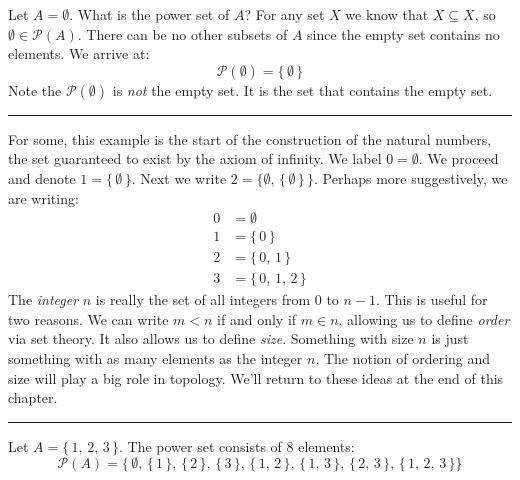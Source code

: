             \begin{example}
                Let $A=\emptyset$. What is the power set of $A$? For any set
                $X$ we know that $X\subseteq{X}$, so
                $\emptyset\in\mathcal{P}(A)$. There can be no other subsets of
                $A$ since the empty set contains no elements. We arrive at:
                \begin{equation}
                    \mathcal{P}(\emptyset)=\{\,\emptyset\,\}
                \end{equation}
                Note the $\mathcal{P}(\emptyset)$ is \textit{not} the empty set.
                It is the set that contains the empty set.
            \end{example}
            \hrule\par\hfill\par
            For some, this example is the start of the construction of the
            natural numbers, the set guaranteed to exist by the axiom of
            infinity. We label $0=\emptyset$. We proceed and denote
            $1=\{\,\emptyset\,\}$. Next we write
            $2=\{\emptyset,\,\{\,\emptyset\,\}\,\}$. Perhaps more suggestively,
            we are writing:
            \begin{align}
                0&=\emptyset\\
                1&=\{\,0\,\}\\
                2&=\{\,0,\,1\,\}\\
                3&=\{\,0,\,1,\,2\,\}
            \end{align}
            The \textit{integer} $n$ is really the set of all integers from $0$
            to $n-1$. This is useful for two reasons. We can write
            $m<n$ if and only if $m\in{n}$, allowing us to define
            \textit{order} via set theory. It also allows us to define
            \textit{size}. Something with size $n$ is just something with as
            many elements as the integer $n$. The notion of ordering and size
            will play a big role in topology. We'll return to these ideas at
            the end of this chapter.
            \par\hfill\par\hrule
            \begin{example}
                Let $A=\{\,1,\,2,\,3\,\}$. The power set consists of $8$
                elements:
                \begin{equation}
                    \mathcal{P}(A)=\big\{\,\emptyset,\,\{\,1\,\},\,
                        \{\,2\,\},\,\{\,3\,\},\,
                        \{\,1,\,2\,\},\,\{\,1,\,3\,\},\,\{\,2,\,3\,\},\,
                        \{\,1,\,2,\,3\,\}
                    \big\}
                \end{equation}
            \end{example}
